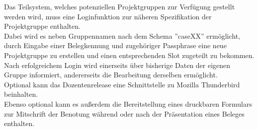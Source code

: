 \documentclass{article}
\begin{document}
Das Teilsystem, welches potenziellen Projektgruppen zur Verfügung gestellt werden wird, muss eine Loginfunktion zur näheren Spezifikation der Projektgruppe enthalten.\\
Dabei wird es neben Gruppennamen nach dem Schema ''caseXX'' ermöglicht, durch Eingabe einer Belegkennung und zugehöriger Passphrase eine neue Projektgruppe zu erstellen und einen entsprechenden Slot zugeteilt zu bekommen.\\
Nach erfolgreichem Login wird einerseits über bisherige Daten der eigenen Gruppe informiert, andererseits die Bearbeitung derselben ermöglicht.\\
Optional kann das Dozentenrelease eine Schnittstelle zu Mozilla Thunderbird beinhalten.\\
Ebenso optional kann es außerdem die Bereitstellung eines druckbaren Formulars zur Mitschrift der Benotung während oder nach der Präsentation eines Beleges enthalten.\\
\end{document}
